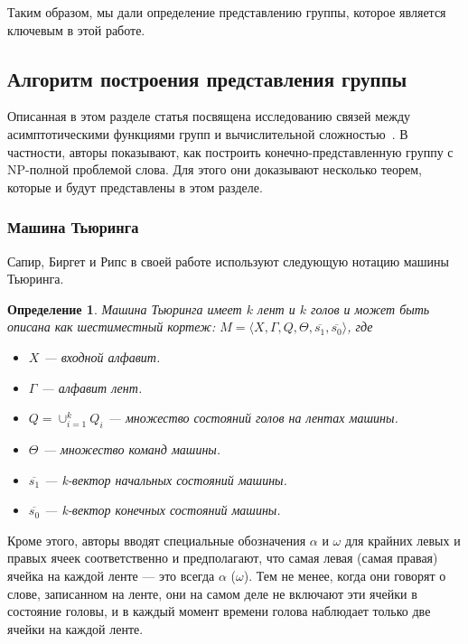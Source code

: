 \documentclass[14pt]{matmex-diploma-custom}
\newtheorem{defn}{Определение}[subsection]
\begin{document}
Таким образом, мы дали определение представлению группы, которое является ключевым в этой работе. 

\subsection{Алгоритм построения представления группы}

Описанная в этом разделе статья посвящена исследованию связей
между асимптотическими функциями групп и вычислительной сложностью~\cite{Sapir}.
В частности, авторы показывают, как построить конечно-представленную группу
с NP-полной проблемой слова. Для этого они доказывают несколько теорем,
которые и будут представлены в этом разделе.

\subsubsection{Машина Тьюринга}

Сапир, Биргет и Рипс в своей работе \cite{Sapir} используют следующую нотацию машины Тьюринга.

\begin{defn} \label{tm}
Машина Тьюринга имеет $ k $ лент и $ k $ голов и может быть описана как шестиместный кортеж:
$M = \langle X, \Gamma, Q, \Theta, \overline{s_1}, \overline{s_0} \rangle$,
где
\begin{itemize}
    \item $X$ --- входной алфавит.
    \item $\Gamma$ --- алфавит лент.
    \item $Q = \cup_{i=1}^k Q_i$ --- множество состояний голов на лентах машины.
    \item $\Theta$ --- множество команд машины.
    \item $\overline{s_1}$ --- k-вектор начальных состояний машины.
    \item $\overline{s_0}$ --- k-вектор конечных состояний машины.
\end{itemize}
\end{defn}

Кроме этого, авторы вводят специальные обозначения $\alpha$ и $\omega$ для крайних левых и правых ячеек соответственно и предполагают, что самая левая (самая правая) ячейка на каждой ленте --- это всегда
$ \alpha $ ($ \omega $). Тем не менее, когда они говорят о слове, записанном на ленте,
они на самом деле не включают эти ячейки в состояние головы, и в каждый момент времени голова
наблюдает только две ячейки на каждой ленте.
\end{document}
